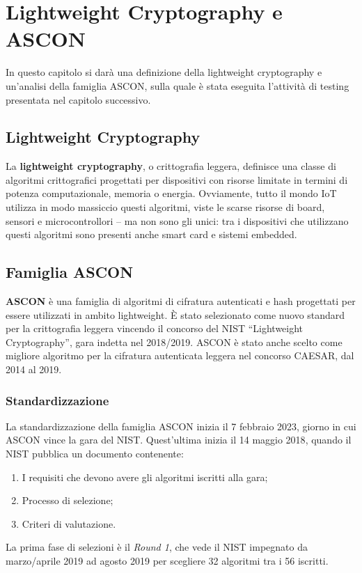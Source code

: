 \chapter{Lightweight Cryptography e ASCON}\label{ch:cryptography}

In questo capitolo si darà una definizione della lightweight cryptography e un'analisi della famiglia ASCON, sulla quale è stata eseguita l'attività di testing presentata nel capitolo successivo.

\section{Lightweight Cryptography}

La \textbf{lightweight cryptography}, o crittografia leggera, definisce una classe di algoritmi crittografici progettati per dispositivi con risorse limitate in termini di potenza computazionale, memoria o energia. Ovviamente, tutto il mondo IoT utilizza in modo massiccio questi algoritmi, viste le scarse risorse di board, sensori e microcontrollori – ma non sono gli unici: tra i dispositivi che utilizzano questi algoritmi sono presenti anche smart card e sistemi embedded.

\section{Famiglia ASCON}

\textbf{ASCON} è una famiglia di algoritmi di cifratura autenticati e hash progettati per essere utilizzati in ambito lightweight. È stato selezionato come nuovo standard per la crittografia leggera vincendo il concorso del NIST ``Lightweight Cryptography'', gara indetta nel 2018/2019. ASCON è stato anche scelto come migliore algoritmo per la cifratura autenticata leggera nel concorso CAESAR, dal 2014 al 2019\cite{ascon-overview}.

\subsection{Standardizzazione}

La standardizzazione della famiglia ASCON inizia il 7 febbraio 2023\cite{nist-timeline}, giorno in cui ASCON vince la gara del NIST. Quest'ultima inizia il 14 maggio 2018\cite{nist-timeline}, quando il NIST pubblica un documento contenente\cite{nist-competition}:
\begin{enumerate}
    \item I requisiti che devono avere gli algoritmi iscritti alla gara;
    \item Processo di selezione;
    \item Criteri di valutazione.
\end{enumerate}
La prima fase di selezioni è il \textit{Round 1}, che vede il NIST impegnato da marzo/aprile 2019 ad agosto 2019 per scegliere 32 algoritmi tra i 56 iscritti\cite{nist-timeline}\cite{nist-competition}\cite{nist-round-1}. \\

